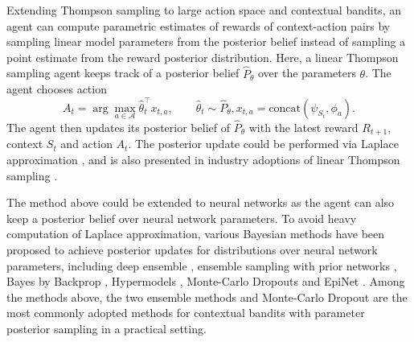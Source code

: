 Extending Thompson sampling to large action space and contextual bandits, an agent can compute parametric estimates of rewards of context-action pairs by sampling linear model parameters from the posterior belief \cite{abeille2017linear, agrawal2013thompson,russo2013eluder,russo2014posterior,russo2018tutorial} instead of sampling a point estimate from the reward posterior distribution. Here, a linear Thompson sampling agent keeps track of a posterior belief $\hat{P}_\theta$ over the parameters $\theta$. The agent chooses action
\begin{equation}
    A_t = \arg\max_{a \in \mathcal{A}} \hat{\theta}_t^\top x_{t, a}, \qquad \hat{\theta}_t \sim \hat{P}_\theta, x_{t, a} = \text{concat}(\psi_{S_t}, \phi_{a}). 
\end{equation}
The agent then updates its posterior belief of $\hat{P}_\theta$ with the latest reward $R_{t+1}$, context $S_t$ and action $A_t$. The posterior update could be performed via Laplace approximation \cite{laplace1986memoir}, and is also presented in industry adoptions of linear Thompson sampling \cite{chapelle2011empirical}. 

The method above could be extended to neural networks as the agent can also keep a posterior belief over neural network parameters. To avoid heavy computation of Laplace approximation, various Bayesian methods have been proposed to achieve posterior updates for distributions over neural network parameters, including deep ensemble \cite{lakshminarayanan2017simple}, ensemble sampling with prior networks \cite{lu2017ensemble}, Bayes by Backprop \cite{blundell2015weight}, Hypermodels \cite{dwaracherla2019hypermodels}, Monte-Carlo Dropouts \cite{gal2016dropout} and EpiNet \cite{osband2021epistemic}. Among the methods above, the two ensemble methods \cite{broden2018ensemble, lu2018efficient, tang2014ensemble} and Monte-Carlo Dropout \cite{guo2020deep} are the most commonly adopted methods for contextual bandits with parameter posterior sampling in a practical setting.

